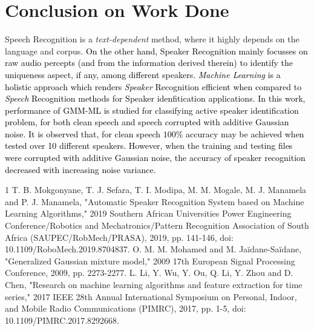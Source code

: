 \documentclass{article}
\begin{document}
{\section{\textbf{{Conclusion on Work Done}}}
\label{conclusion}
Speech Recognition \cite{10} is a \textit{text-dependent} method, where it highly depends on the language and corpus. \textcolor{black}{On the other hand, Speaker Recognition mainly focusses on raw audio percepts (and from the information derived therein) %
to identify the uniqueness aspect, if any, among different speakers. \textit{Machine Learning} is a holistic approach which renders \textit{Speaker} Recognition efficient when compared to \textit{Speech} Recognition methods for Speaker idenfitication applications. %
In this work, performance of GMM-ML is studied for classifying active speaker identification problem, for both clean speech and speech corrupted with additive Gaussian noise. \textcolor{black}{It is observed that, for clean speech $100\%$ accuracy may be achieved when tested over 10 different speakers. However, when the training and testing files were corrupted with additive Gaussian noise, the accuracy of speaker recognition decreased with increasing noise variance. }}
%
\begin{thebibliography}{1}
 T. B. Mokgonyane, T. J. Sefara, T. I. Modipa, M. M. Mogale, M. J. Manamela and P. J. Manamela, "Automatic Speaker Recognition System based on Machine Learning Algorithms," 2019 Southern African Universities Power Engineering Conference/Robotics and Mechatronics/Pattern Recognition Association of South Africa (SAUPEC/RobMech/PRASA), 2019, pp. 141-146, doi: 10.1109/RoboMech.2019.8704837.
O. M. M. Mohamed and M. Jaïdane-Saïdane, "Generalized Gaussian mixture model," 2009 17th European Signal Processing Conference, 2009, pp. 2273-2277.
L. Li, Y. Wu, Y. Ou, Q. Li, Y. Zhou and D. Chen, "Research on machine learning algorithms and feature extraction for time series," 2017 IEEE 28th Annual International Symposium on Personal, Indoor, and Mobile Radio Communications (PIMRC), 2017, pp. 1-5, doi: 10.1109/PIMRC.2017.8292668. 

\end{thebibliography}}
\end{document}
